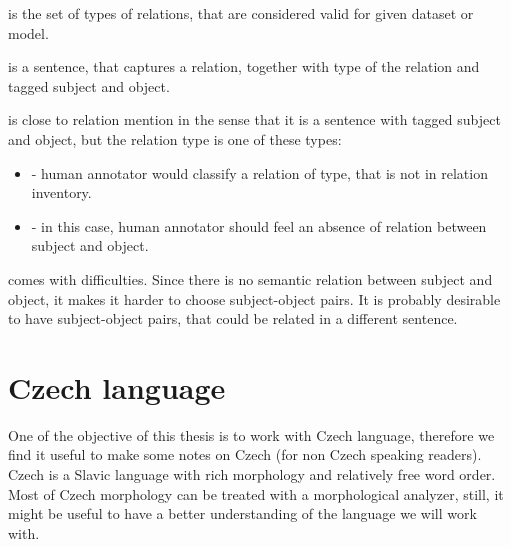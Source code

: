  is the set of types of relations, that are considered valid for given dataset or model.

 is a sentence, that captures a relation, together with type of the relation and tagged subject and object. 

 is close to relation mention in the sense that it is a sentence with tagged subject and object, but the relation type is one of these types: 
\begin{itemize}
\item {} - human annotator would classify a relation of type, that is not in relation inventory. 
\item {} - in this case, human annotator should feel an absence of relation between subject and object.  

\end{itemize}

 comes with difficulties. Since there is no semantic relation between subject and object, it makes it harder to choose subject-object pairs. It is probably desirable to have subject-object pairs, that could be related in a different sentence. 

 

 


\section{Czech language}
One of the objective of this thesis is to work with Czech language, therefore we find it useful to make some notes on Czech (for non Czech speaking readers). Czech is a Slavic language with rich morphology and relatively free word order. Most of Czech morphology can be treated with a morphological analyzer, still, it might be useful to have a better understanding of the language we will work with.

